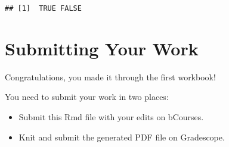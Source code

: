 \documentclass[
]{article}
\providecommand{\tightlist}{%
  \setlength{\itemsep}{0pt}\setlength{\parskip}{0pt}}
\begin{document}
\begin{verbatim}
## [1]  TRUE FALSE
\end{verbatim}

\hypertarget{submitting-your-work}{%
\section{Submitting Your Work}\label{submitting-your-work}}

Congratulations, you made it through the first workbook!

You need to submit your work in two places:

\begin{itemize}
\tightlist
\item
  Submit this Rmd file with your edits on bCourses.
\item
  Knit and submit the generated PDF file on Gradescope.
\end{itemize}
\end{document}
